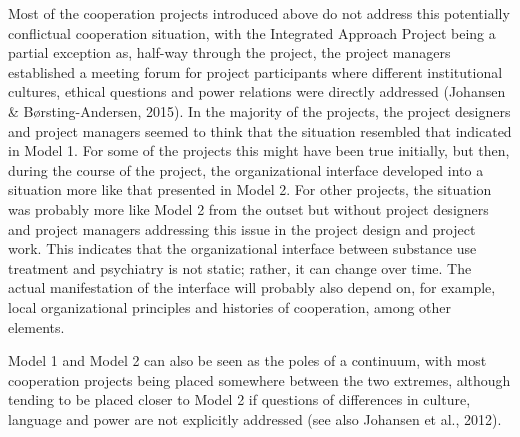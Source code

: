     \FloatBarrier
    \begin{multicols}{2}
Most of the cooperation projects introduced above do not address this potentially conflictual cooperation situation, with the Integrated Approach Project being a partial exception as, half-way through the project, the project managers established a meeting forum for project participants where different institutional cultures, ethical questions and power relations were directly addressed (Johansen \& Børsting-Andersen, 2015). In the majority of the projects, the project designers and project managers seemed to think that the situation resembled that indicated in Model 1. For some of the projects this might have been true initially, but then, during the course of the project, the organizational interface developed into a situation more like that presented in Model 2. For other projects, the situation was probably more like Model 2 from the outset but without project designers and project managers addressing this issue in the project design and project work. This indicates that the organizational interface between substance use treatment and psychiatry is not static; rather, it can change over time. The actual manifestation of the interface will probably also depend on, for example, local organizational principles and histories of cooperation, among other elements.
\par
Model 1 and Model 2 can also be seen as the poles of a continuum, with most cooperation projects being placed somewhere between the two extremes, although tending to be placed closer to Model 2 if questions of differences in culture, language and power are not explicitly addressed (see also Johansen et al., 2012). 


\end{multicols}
